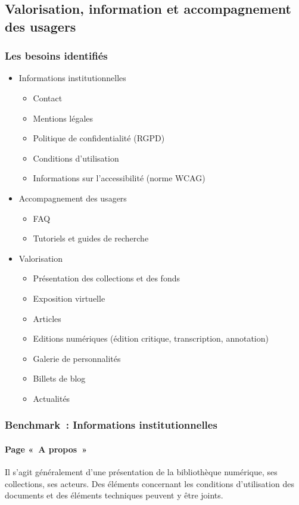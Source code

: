 \subsection{Valorisation, information et accompagnement des usagers}
\subsubsection{Les besoins identifiés}
\begin{itemize}
	\item Informations institutionnelles
\begin{itemize}
	\item Contact
\item Mentions légales
\item Politique de confidentialité (RGPD)
\item Conditions d’utilisation
\item Informations sur l’accessibilité (norme WCAG)
\end{itemize}
\item Accompagnement des usagers
\begin{itemize}
	\item FAQ
\item Tutoriels et guides de recherche
\end{itemize}
\item Valorisation 
\begin{itemize}
	\item Présentation des collections et des fonds
\item Exposition virtuelle
\item Articles 
\item Editions numériques (édition critique, transcription, annotation)
\item Galerie de personnalités 
\item Billets de blog 
\item Actualités
\end{itemize}
\end{itemize}

\subsubsection{Benchmark : Informations institutionnelles}

\paragraph*{Page « A propos »}
Il s’agit généralement d’une présentation de la bibliothèque numérique, ses collections, ses acteurs. Des éléments concernant les conditions d’utilisation des documents et des éléments techniques peuvent y être joints. 

